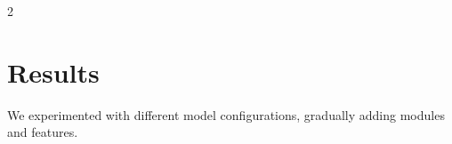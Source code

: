 \documentclass[11pt]{article}
\begin{document}
\begin{multicols}{2}



        \section{Results}
        We experimented with different model configurations, gradually adding modules and features.


\end{multicols}
\end{document}
